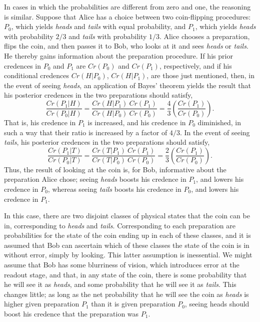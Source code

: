 \documentclass[12pt]{article}
\begin{document}
In cases in which the probabilities are different from zero and one, the reasoning is similar. Suppose that Alice has a choice between two coin-flipping procedures: $P_0$, which yields \emph{heads} and \emph{tails} with equal probability, and $P_1$, which yields \emph{heads} with probability $2/3$ and \emph{tails}  with probability $1/3$.  Alice chooses a preparation, flips the coin, and then passes it to Bob, who looks at it and sees  \emph{heads} or \emph{tails}. He thereby gains information about the preparation procedure. If his prior credences in $P_0$ and $P_1$ are $Cr(P_0)$ and $Cr(P_1)$, respectively, and if his conditional credences $Cr(H|P_0)$, $Cr(H|P_1)$, are those just mentioned, then, in the event of seeing \emph{heads},  an application of Bayes' theorem yields the result that his posterior credences in the two preparations should satisfy,
\begin{equation}
\frac{Cr(P_1|H)}{Cr(P_0|H)} = \frac{Cr(H|P_1) \: Cr(P_1)}{Cr(H|P_0) \: Cr(P_0)} = \frac{4}{3} \left(\frac{Cr(P_1)}{Cr(P_0)}\right).
\end{equation}
That is, his credence in $P_1$ is increased, and his credence in $P_0$ diminished, in such a way that their ratio is increased by a factor of $4/3$.  In the event of seeing \emph{tails}, his posterior credences in the two preparations should satisfy,
\begin{equation}
\frac{Cr(P_1|T)}{Cr(P_0|T)} = \frac{Cr(T|P_1) \: Cr(P_1)}{Cr(T|P_0) \: Cr(P_0)} = \frac{2}{3} \left(\frac{Cr(P_1)}{Cr(P_0)}\right).
\end{equation}
Thus, the result of looking at the coin is, for Bob,  informative about the preparation Alice chose; seeing \emph{heads} boosts his credence in $P_1$, and lowers his credence in $P_0$, whereas seeing \emph{tails} boosts his credence in $P_0$, and lowers his credence in $P_1$.

In this case, there are two disjoint classes of physical states that the coin can be in, corresponding to \emph{heads} and \emph{tails}.  Corresponding to each preparation are probabilities for the state of the coin ending up in each of these classes, and it is assumed that Bob can ascertain which of these classes the state of the coin is in without error, simply by looking.  This latter assumption is inessential. We might assume that Bob has some  blurriness of vision, which introduces error at the readout stage, and that, in any state of the coin, there is some probability that he will see it as \emph{heads}, and some probability that he will see it as \emph{tails}.   This changes little; as long as the net probability that he will see the coin as \emph{heads} is higher given preparation $P_1$ than it is given preparation  $P_0$, seeing heads should boost his credence that the preparation was $P_1$.
\end{document}
